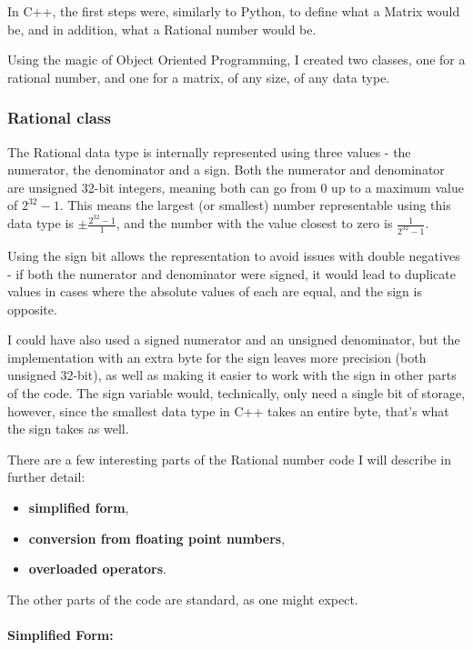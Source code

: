 \documentclass[11pt, a4paper]{article}
\begin{document}
In C++, the first steps were, similarly to Python, to define what a Matrix would be, and in addition, what a Rational number would be.

Using the magic of Object Oriented Programming, I created two classes, one for a rational number, and one for a matrix, of any size, of any data type.

\subsubsection{Rational class}

The Rational data type is internally represented using three values - the numerator, the denominator and a sign.
Both the numerator and denominator are unsigned 32-bit integers, meaning both can go from $0$ up to a maximum value of $2^{32}-1$.
This means the largest (or smallest) number representable using this data type is $\pm\frac{2^{32}-1}{1}$, and the number with the value closest to zero is $\frac{1}{2^{32}-1}$.

Using the sign bit allows the representation to avoid issues with double negatives - 
if both the numerator and denominator were signed, it would lead to duplicate values in cases where the absolute values of each are equal, and the sign is opposite.

I could have also used a signed numerator and an unsigned denominator, but the implementation with an extra byte for the sign leaves more precision (both unsigned 32-bit),
as well as making it easier to work with the sign in other parts of the code.
The sign variable would, technically, only need a single bit of storage, however, since the smallest data type in C++ takes an entire byte, that's what the sign takes as well.

There are a few interesting parts of the Rational number code I will describe in further detail:
\begin{itemize}
  \item \textbf{simplified form},
  \item \textbf{conversion from floating point numbers},
  \item \textbf{overloaded operators}.
\end{itemize}

The other parts of the code are standard, as one might expect.

\paragraph{Simplified Form:}
\end{document}
